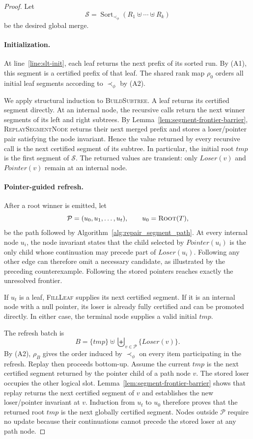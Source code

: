 \begin{proof}
Let
\[
  \mathcal S=
  \operatorname{Sort}_{\prec_\phi}
  (R_1\uplus\cdots\uplus R_k)
\]
be the desired global merge.

\paragraph{Initialization.}
At line~\ref{line:slt-init}, each leaf returns the next prefix of its
sorted run. By (A1), this segment is a certified prefix of that leaf.
The shared rank map $\rho_0$ orders all initial leaf segments according
to $\prec_\phi$ by (A2).

We apply structural induction to \textsc{BuildSubtree}. A leaf returns
its certified segment directly. At an internal node, the recursive calls
return the next winner segments of its left and right subtrees. By
Lemma~\ref{lem:segment-frontier-barrier},
\textsc{ReplaySegmentNode} returns their next merged prefix and stores a
loser/pointer pair satisfying the node invariant. Hence the value
returned by every recursive call is the next certified segment of its
subtree. In particular, the initial root $tmp$ is the first segment of
$\mathcal S$. The returned values are transient: only
$\mathit{Loser}(v)$ and $\mathit{Pointer}(v)$ remain at an internal node.

\paragraph{Pointer-guided refresh.}
After a root winner is emitted, let
\[
  \mathcal P=(u_0,u_1,\ldots,u_t),
  \qquad u_0=\textsc{Root}(T),
\]
be the path followed by Algorithm~\ref{alg:repair_segment_path}.
At every internal node $u_i$, the node invariant states that the child
selected by $\mathit{Pointer}(u_i)$ is the only child whose continuation
may precede part of $\mathit{Loser}(u_i)$. Following any other edge can
therefore omit a necessary candidate, as illustrated by the preceding
counterexample. Following the stored pointers reaches exactly the
unresolved frontier.

If $u_t$ is a leaf, \textsc{FillLeaf} supplies its next certified
segment. If it is an internal node with a null pointer, its loser is
already fully certified and can be promoted directly. In either case,
the terminal node supplies a valid initial $tmp$.

The refresh batch is
\[
  B=\{tmp\}\uplus
    \biguplus_{v\in\mathcal P}\{\mathit{Loser}(v)\}.
\]
By (A2), $\rho_B$ gives the order induced by $\prec_\phi$ on every item
participating in the refresh. Replay then proceeds bottom-up. Assume the
current $tmp$ is the next certified segment returned by the pointer
child of a path node $v$. The stored loser occupies the other logical
slot. Lemma~\ref{lem:segment-frontier-barrier} shows that replay returns
the next certified segment of $v$ and establishes the new loser/pointer
invariant at $v$. Induction from $u_t$ to $u_0$ therefore proves that the
returned root $tmp$ is the next globally certified segment. Nodes
outside $\mathcal P$ require no update because their continuations cannot
precede the stored loser at any path node.


\end{proof}
